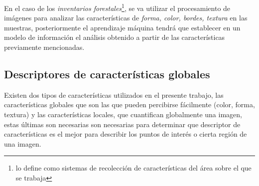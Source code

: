 \documentclass[review]{elsarticle}
\begin{document}
En el caso de los \emph{inventarios forestales}\footnote{\citet{rf9} lo define como sistemas de recolección de características del área sobre el que se trabaja}, se va utilizar el procesamiento de imágenes para analizar las características de \textit{forma, color, bordes, textura} en las muestras, posteriormente el aprendizaje máquina tendrá que establecer en un modelo de información el análisis obtenido a partir de las características previamente mencionadas.

%
%

\subsection{Descriptores de características globales}
Existen dos tipos de características utilizados en el presente trabajo, las características globales que son las que pueden percibirse fácilmente (color, forma, textura) y las características locales, que cuantifican globalmente una imagen, estas últimas son necesarias son necesarias para determinar que descriptor de características es el mejor para describir los puntos de interés o cierta región de una imagen.
\clearpage
\end{document}
